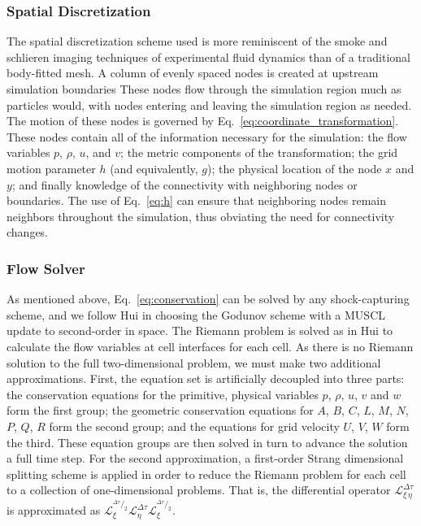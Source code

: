 \documentclass[12pt,letterpaper]{article}
\begin{document}
\subsubsection{Spatial Discretization}
\label{sec:spatial_discretization}
The spatial discretization scheme used is more reminiscent of the
smoke and schlieren imaging techniques of experimental fluid dynamics
than of a traditional body-fitted mesh. A column of evenly spaced
nodes is created at upstream simulation boundaries These nodes
flow through the simulation region much as particles would, with nodes
entering and leaving the simulation region as needed. The motion of
these nodes is governed by
Eq.~\ref{eq:coordinate_transformation}. These nodes contain all of the
information necessary for the simulation: the flow variables $p$,
$\rho$, $u$, and $v$; the metric components of the transformation; the
grid motion parameter $h$ (and equivalently, $g$); the physical
location of the node $x$ and $y$; and finally knowledge of the
connectivity with neighboring nodes or boundaries. The use of
Eq.~\ref{eq:h} can ensure that neighboring nodes remain neighbors
throughout the simulation, thus obviating the need for connectivity
changes. 
\subsubsection{Flow Solver}
As mentioned above, Eq.~\ref{eq:conservation} can be solved by any shock-capturing scheme, and we follow Hui in choosing the Godunov scheme with a MUSCL update to second-order in space. The Riemann problem is solved as in Hui\cite{hui99} to calculate the flow variables at cell interfaces for each cell. As there is no Riemann solution to the full two-dimensional problem, 
we must make two additional approximations. First, the equation set is
artificially decoupled into three parts: the conservation equations
for the primitive, physical variables $p$,
$\rho$, $u$, $v$ and $w$ form the first group; the geometric conservation
equations for $A$, $B$, $C$, $L$, $M$, $N$, $P$, $Q$, $R$ form the second group; and the
equations for grid velocity $U$, $V$, $W$ form the third. These
equation groups are then
solved in turn to advance the solution a full time step. For the
second approximation, a first-order Strang dimensional splitting
scheme is applied in order to reduce the Riemann problem for each cell
to a collection of one-dimensional problems. That is, the differential
operator $\mathcal{L}_{\xi\,\eta}^{\Delta\tau}$ is approximated as
$\mathcal{L}_{\xi}^{^{\Delta\tau}/_{2}}\mathcal{L}_{\eta}^{\Delta\tau}\mathcal{L}_{\xi}^{^{\Delta\tau}/_2}$.
\end{document}
